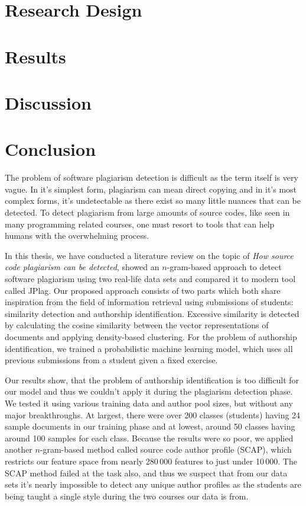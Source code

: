 \documentclass[english, grading]{tktltiki2}
\theoremstyle{definition}
\theoremstyle{remark}
\numberwithin{equation}{section} %
\begin{document}
\section{Research Design}


\section{Results}


\section{Discussion}



\section{Conclusion}

The problem of software plagiarism detection is difficult as the term itself is very vague. In it's simplest form, plagiarism can mean direct copying and in it's most complex forms, it's undetectable as there exist so many little nuances that can be detected. To detect plagiarism from large amounts of source codes, like seen in many programming related courses, one must resort to tools that can help humans with the overwhelming process. 

In this thesis, we have conducted a literature review on the topic of \emph{How source code plagiarism can be detected}, showed an $n$-gram-based approach to detect software plagiarism using two real-life data sets and compared it to modern tool called JPlag. Our proposed approach consists of two parts which both share inspiration from the field of information retrieval using submissions of students: similarity detection and authorship identification. Excessive similarity is detected by calculating the cosine similarity between the vector representations of documents and applying density-based clustering. For the problem of authorship identification, we trained a probabilistic machine learning model, which uses all previous submissions from a student given a fixed exercise. 


Our results show, that the problem of authorship identification is too difficult for our model and thus we couldn't apply it during the plagiarism detection phase. We tested it using various training data and author pool sizes, but without any major breakthroughs. At largest, there were over 200 classes (students) having 24 sample documents in our training phase and at lowest, around 50 classes having around 100 samples for each class.  Because the results were so poor, we applied another $n$-gram-based method called source code author profile (SCAP), which restricts our feature space from nearly 280\,000 features to just under 10\,000. The SCAP method failed at the task also, and thus we suspect that from our data sets it's nearly impossible to detect any unique author profiles as the students are being taught a single style during the two courses our data is from.  
\end{document}
